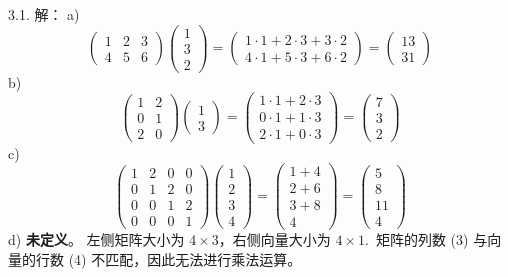 \begin{exer}
3.1. 解：
a)
$$
\begin{pmatrix} 1 & 2 & 3 \\ 4 & 5 & 6 \end{pmatrix} \begin{pmatrix} 1 \\ 3 \\ 2 \end{pmatrix} = \begin{pmatrix} 1\cdot 1 + 2\cdot 3 + 3\cdot 2 \\ 4\cdot 1 + 5\cdot 3 + 6\cdot 2 \end{pmatrix} = \begin{pmatrix} 13 \\ 31 \end{pmatrix}
$$
b)
$$
\begin{pmatrix} 1 & 2 \\ 0 & 1 \\ 2 & 0 \end{pmatrix} \begin{pmatrix} 1 \\ 3 \end{pmatrix} = \begin{pmatrix} 1\cdot 1 + 2\cdot 3 \\ 0\cdot 1 + 1\cdot 3 \\ 2\cdot 1 + 0\cdot 3 \end{pmatrix} = \begin{pmatrix} 7 \\ 3 \\ 2 \end{pmatrix}
$$
c)
$$
\begin{pmatrix} 1 & 2 & 0 & 0 \\ 0 & 1 & 2 & 0 \\ 0 & 0 & 1 & 2 \\ 0 & 0 & 0 & 1 \end{pmatrix} \begin{pmatrix} 1 \\ 2 \\ 3 \\ 4 \end{pmatrix} = \begin{pmatrix} 1 + 4 \\ 2 + 6 \\ 3 + 8 \\ 4 \end{pmatrix} = \begin{pmatrix} 5 \\ 8 \\ 11 \\ 4 \end{pmatrix}
$$
d) \textbf{未定义}。
左侧矩阵大小为 $4 \times 3$，右侧向量大小为 $4 \times 1$.~矩阵的列数 (3) 与向量的行数 (4) 不匹配，因此无法进行乘法运算。


\end{exer}
